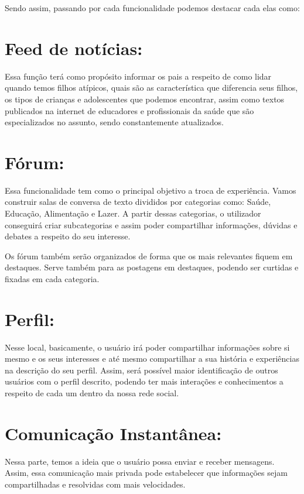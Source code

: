 \begin{apendicesenv}
	Sendo assim, passando por cada funcionalidade podemos destacar cada elas como: 
	
	
	
	
	
	\section{Feed de notícias:}
	Essa função terá como propósito informar os pais a respeito de como lidar quando temos filhos atípicos, quais são as característica que diferencia seus filhos, os tipos de crianças e adolescentes que podemos encontrar, assim como textos publicados na internet de educadores e profissionais da saúde que são especializados no assunto, sendo constantemente atualizados. 
	
	\section{Fórum:}
	Essa funcionalidade tem como o principal objetivo a troca de experiência. Vamos construir salas de conversa de texto divididos por categorias como: Saúde, Educação, Alimentação e Lazer. A partir dessas categorias, o utilizador conseguirá criar subcategorias e assim poder compartilhar informações, dúvidas e debates a respeito do seu interesse.
	
	Os fórum também serão organizados de forma que os mais relevantes fiquem em destaques. Serve também para as postagens em destaques, podendo ser curtidas e fixadas em cada categoria. 
	
	\section{Perfil:}
	Nesse local, basicamente, o usuário irá poder compartilhar informações sobre si mesmo e os seus interesses e até mesmo compartilhar a sua história e experiências na descrição do seu perfil. Assim, será possível maior identificação de outros usuários com o perfil descrito, podendo ter mais interações e conhecimentos a respeito de cada um dentro da nossa rede social. 
	
	\section{Comunicação Instantânea: }
	Nessa parte, temos a ideia que o usuário possa enviar e receber mensagens. Assim, essa comunicação mais privada pode estabelecer que informações sejam compartilhadas e resolvidas com mais velocidades. 
	

\end{apendicesenv}
